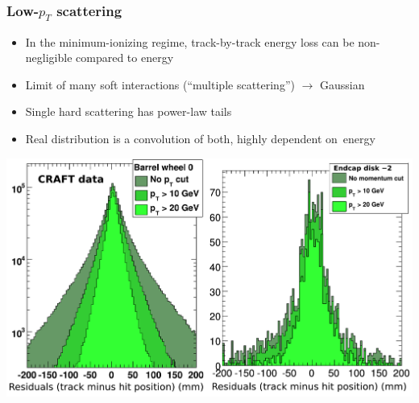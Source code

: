 \documentclass[compress]{beamer}
\begin{document}
\begin{frame}
\frametitle{Low-$p_T$ scattering}

\begin{itemize}
\item In the minimum-ionizing regime, track-by-track energy loss can
  be non-negligible compared to energy
\item Limit of many soft interactions (``multiple scattering'') $\to$ Gaussian
\item Single hard scattering has power-law tails
\item Real distribution is a convolution of both, highly dependent \mbox{on energy\hspace{-1 cm}}
\end{itemize}
\begin{center}
\includegraphics[width=0.85\linewidth]{residuals_with_tails.pdf}
\end{center}
\end{frame}
\end{document}
